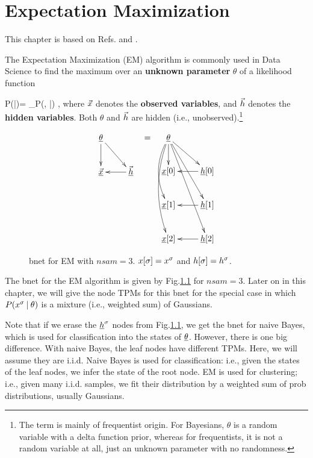\chapter{Expectation Maximization}
\label{ch-emax}

This chapter is based on
Refs.\cite{wiki-em}
and \cite{emory-biostat}.

The Expectation Maximization (EM)
algorithm
is commonly used in Data Science
to find the maximum
over an {\bf unknown parameter} $\theta$ of a
 likelihood function

\beq
P(\vecx|\theta)=
\sum_\vech P(\vecx, \vech|\theta)
\;,
\eeq
where ${\vec{x}}$
denotes the {\bf observed variables},
and ${\vec{h}}$ denotes the
{\bf hidden variables}.
Both $\theta$
and ${\vec{h}}$
are hidden (i.e.,
unobserved).\footnote{
The term
is mainly of frequentist origin.
For Bayesians, $\theta$
is a random variable with
a delta function prior,
whereas for frequentists,
it is not
a random variable at all,
just an unknown parameter
with no randomness.}



\begin{figure}[h!]
\centering
$$\begin{array}{ccc}
\xymatrix{
\ul{\theta}\ar[d]\ar[dr]
\\
\ul{\vecx}&\ul{\vech}\ar[l]
}
&=&
\xymatrix{
\ul{\theta}
\ar[d]
\ar@/_1pc/[dd]
\ar@/_1pc/[ddd]
\ar[rd]\ar[rdd]\ar[rddd]
\\
\rvx[0]
&\rvh[0]\ar[l]
\\
\rvx[1]
&\rvh[1]\ar[l]
\\
\rvx[2]
&\rvh[2]\ar[l]
}
\end{array}
$$
\caption{bnet for EM with $nsam=3$.
$x[\sigma]=x^\sigma$ and $h[\sigma]=h^\sigma$.}
\label{fig-em-bnet}
\end{figure}


The bnet for the EM algorithm
is given by Fig.\ref{fig-em-bnet}
for $nsam=3$.
Later on in this chapter,
we will give the node TPMs
for this bnet for
the special
case in which $P(x^\sigma{\:\mathbf{|}\:} \theta)$
is a mixture (i.e., weighted sum)
of Gaussians.

Note that if we
erase the $\rvh^\s$ nodes
from Fig.\ref{fig-em-bnet},
we get the bnet for naive Bayes,
which is used for classification
into the states of $\ul{\theta}$.
However, there is one big
difference.
With naive Bayes,
the leaf nodes have
different TPMs.
Here, we will assume they are i.i.d.
Naive Bayes is used for classification: i.e.,
given the states
of the leaf nodes,
we infer the state of the root node.
EM is used for clustering; i.e.,
given many i.i.d. samples,
we fit their distribution by a weighted sum
of prob distributions,
usually Gaussians.

